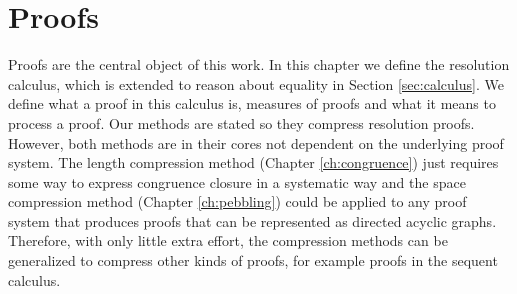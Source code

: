 \chapter*{Proofs}

Proofs are the central object of this work.
In this chapter we define the resolution calculus, which is extended to reason about equality in Section \ref{sec:calculus}.
We define what a proof in this calculus is, measures of proofs and what it means to process a proof.
Our methods are stated so they compress resolution proofs.
However, both methods are in their cores not dependent on the underlying proof system.
The length compression method (Chapter \ref{ch:congruence}) just requires some way to express congruence closure in a systematic way and the space compression method (Chapter \ref{ch:pebbling}) could be applied to any proof system that produces proofs that can be represented as directed acyclic graphs.
Therefore, with only little extra effort, the compression methods can be generalized to compress other kinds of proofs, for example proofs in the sequent calculus.



%

%




